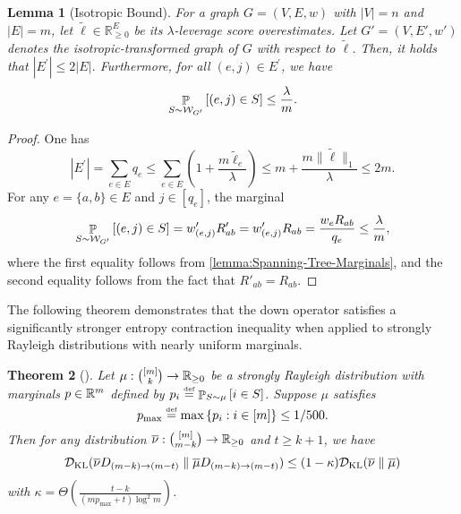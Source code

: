 \documentclass[11pt]{article}
\newtheorem{theorem}{Theorem} \newtheorem{lemma}[theorem]{Lemma} \newtheorem{proposition}[theorem]{Proposition} \newtheorem{corollary}[theorem]{Corollary} \newtheorem{definition}[theorem]{Definition} \newtheorem{conjecture}[theorem]{Conjecture} \newtheorem{claim}[theorem]{Claim} \newtheorem{fact}[theorem]{Fact}
\newcommand{\norms}[1]{\lVert #1 \rVert}
\newcommand{\abss}[1]{\left\lvert #1 \right\rvert}
\newcommand{\paren}[1]{\left( #1 \right)}
\newcommand{\parens}[1]{( #1 )}
\newcommand{\sqb}[1]{\left[ #1 \right]}
\newcommand{\set}[1]{\left\{ #1 \right\}}
\newcommand{\sets}[1]{\{ #1 \}}
\newcommand{\defeq}{\stackrel{\smash{\text{\tiny\rm def}}}{=}}
\begin{document}
{\begin{lemma}[Isotropic Bound]\label{le:isotropic-transform-on-graph}
For a graph $G = (V, E, w)$
with $\abss{V} = n$ and $\abss{E} = m$,
let $\widetilde{\ell}\in \mathbb{R}^E_{\geq 0}$ be 
its $\lambda$-leverage score overestimates.
Let $G' = (V, E', w')$ denotes
the isotropic-transformed graph of $G$
with respect to $\widetilde{\ell}$.
Then,
it holds that
$\abss{E^\prime}\leq 2 \abss{E}$.
Furthermore,
for all $(e, j) \in E ^\prime$, 
we have
\[
\pb_{S \sim \cW_{G ^\prime}}\sqb{\parens{e,j}\in S} \leq\frac{\lambda}{m}.
\]
\end{lemma}
\begin{proof}
	One has
	\begin{equation*}
		\abss{E^\prime}=\sum_{e\in E}q_e\leq \sum_{e\in E}\paren{1+\frac{m \widetilde\ell_e}{\lambda}}\leq m+\frac{m\norms{\widetilde\ell}_1}{\lambda}\leq2m.
	\end{equation*}
	For any $e=\sets{a,b} \in E$ and $j\in \sqb{q_e}$, the marginal 
	\begin{equation*}
		\pb_{S \sim \cW_{G ^\prime}}\sqb{(e, j)\in S}
        = w^\prime_{\paren{e, j}} R'_{ab}
        = w^\prime_{\paren{e, j}} R_{ab}
        = \frac{w_e R_{ab}}{q_e}\leq \frac{\lambda}{m},
	\end{equation*}
    where the first equality follows from \cref{lemma:Spanning-Tree-Marginals}, and the second  equality follows from the fact that $R'_{ab} = R_{ab}$.
\end{proof}

The following theorem demonstrates that the down operator satisfies a significantly stronger entropy contraction inequality when applied to strongly Rayleigh distributions with nearly uniform marginals.

\begin{theorem}[{\cite[Theorem 28]{ALV22}}]\label{thm:isotropy-entropy-contraction}
	Let $\mu: \binom{\sqb{m}}{k}\to \RR_{\geq 0}$ be a strongly Rayleigh distribution with marginals $p\in \mathbb{R}^{m}$ defined by $p_i\defeq\pb_{S \sim \mu}\sqb{ i \in S}$.
Suppose $\mu$ satisfies
\begin{equation*}
  p_{\max} \defeq \max\set{ p_i: i \in \sqb{m}} \leq  1/500.
\end{equation*}
Then for any distribution $\bar \nu:\binom{\sqb{m}}{m-k}\to \RR_{\geq 0}$ and $t \geq k +1$, we have
\begin{equation*}
	\cD_{\KL}\parens{\bar \nu D _{\parens{m-k}\to \parens{m-t}}\parallel \bar \mu D_{\parens{m-k}\to \parens{m-t}}}\leq \parens{1-\kappa} \cD_{\KL}\parens{\bar \nu\parallel \bar \mu}
\end{equation*}
with $\kappa=\Theta\paren{\frac{ t- k }{\parens{m p_{\max}+t}\log^2 m}}$. 
\end{theorem}



}
\end{document}
